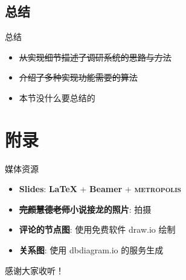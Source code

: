 \documentclass[UTF8]{ctexbeamer}
\begin{document}
\subsection{总结}
\begin{frame}{总结}
\begin{itemize}
  \item \sout{从实现细节描述了调研系统的思路与方法}
  \item \sout{介绍了多种实现功能需要的算法}
  \item 本节没什么要总结的
\end{itemize}
\end{frame}

\appendix

\section{附录}

%

\begin{frame}{媒体资源}

\begin{itemize}
    \item \textbf{Slides}: \textbf{\LaTeX{}} + \textbf{Beamer} + \textbf{\textsc{metropolis}}
    \item \textbf{\sout{完颜慧德老师}小说接龙的照片}: 拍摄
    \item \textbf{评论的节点图}: 使用免费软件 draw.io 绘制
    \item \textbf{关系图}: 使用 dbdiagram.io 的服务生成
\end{itemize}

\end{frame}

\begin{frame}[label=end, standout]
感谢大家收听！
\end{frame}
\end{document}
